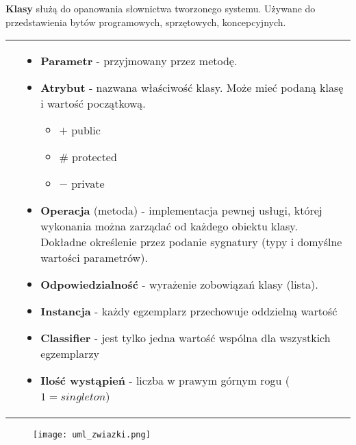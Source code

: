 \documentclass[../main.tex]{subfiles}
\begin{document}
    \textbf{Klasy} służą do opanowania słownictwa tworzonego systemu. Używane do przedstawienia bytów programowych, sprzętowych,
    koncepcyjnych.


    \begin{table}[H]
        \begin{center}
            \begin{tabular}{ c p{8cm} }
                \raisebox{-\totalheight}{\texttt{[image: diagram\_klasy.png]}}
                &
                \begin{itemize}
                    \item \textbf{Parametr} - przyjmowany przez metodę.
                    \item \textbf{Atrybut} - nazwana właściwość klasy. Może mieć podaną klasę i wartość początkową.
                    \begin{itemize}
                        \item $+$  public
                        \item \# protected
                        \item $-$ private
                    \end{itemize}
                    \item \textbf{Operacja} (metoda) - implementacja pewnej usługi, której wykonania można zarządać
                    od każdego obiektu klasy. Dokładne określenie przez podanie sygnatury (typy i domyślne wartości parametrów).
                    \item \textbf{Odpowiedzialność} - wyrażenie zobowiązań klasy (lista).

                    \item \textbf{Instancja} - każdy egzemplarz przechowuje oddzielną wartość
                    \item \textbf{Classifier} - jest tylko jedna wartość wspólna dla wszystkich egzemplarzy
                    \item \textbf{Ilość wystąpień} - liczba w prawym górnym rogu ($1 = singleton$)
                \end{itemize}
                \\
            \end{tabular}
        \end{center}
    \end{table}


    \begin{figure}[H]
        \texttt{[image: uml\_zwiazki.png]}
    \end{figure}
\end{document}
